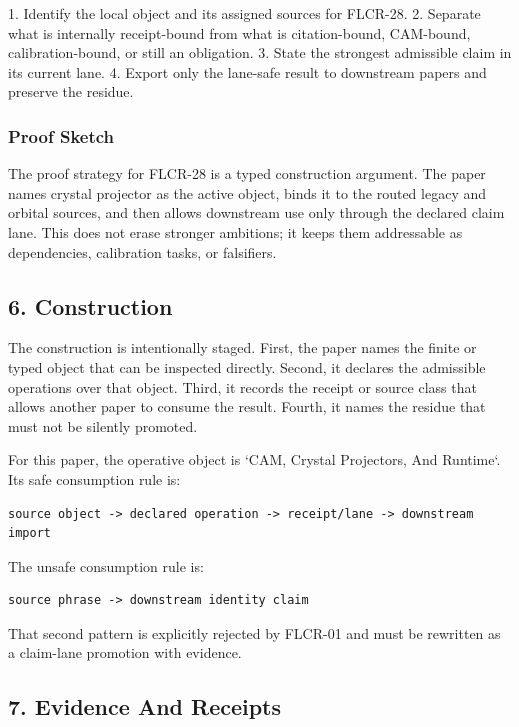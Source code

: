 \documentclass[11pt]{article}
\begin{document}
1. Identify the local object and its assigned sources for FLCR-28.
2. Separate what is internally receipt-bound from what is citation-bound, CAM-bound, calibration-bound, or still an obligation.
3. State the strongest admissible claim in its current lane.
4. Export only the lane-safe result to downstream papers and preserve the residue.

\subsubsection*{Proof Sketch}

The proof strategy for FLCR-28 is a typed construction argument. The paper names crystal projector as the active object, binds it to the routed legacy and orbital sources, and then allows downstream use only through the declared claim lane. This does not erase stronger ambitions; it keeps them addressable as dependencies, calibration tasks, or falsifiers.

\subsection*{6. Construction}

The construction is intentionally staged. First, the paper names the finite or
typed object that can be inspected directly. Second, it declares the admissible
operations over that object. Third, it records the receipt or source class that
allows another paper to consume the result. Fourth, it names the residue that
must not be silently promoted.

For this paper, the operative object is `CAM, Crystal Projectors, And Runtime`. Its safe consumption
rule is:

\begin{verbatim}
source object -> declared operation -> receipt/lane -> downstream import
\end{verbatim}

The unsafe consumption rule is:

\begin{verbatim}
source phrase -> downstream identity claim
\end{verbatim}

That second pattern is explicitly rejected by FLCR-01 and must be rewritten as
a claim-lane promotion with evidence.

\subsection*{7. Evidence And Receipts}
\end{document}
